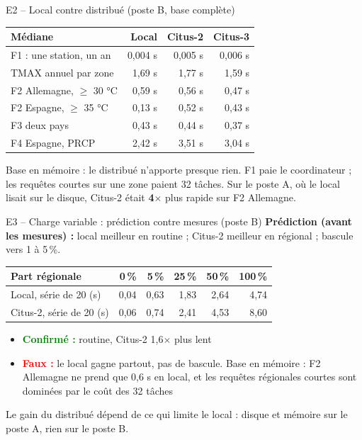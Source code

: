 \documentclass[aspectratio=169]{pres}
\begin{document}
\begin{frame}{E2 -- Local contre distribué (poste B, base complète)}
  \small
  \begin{table}
    \centering
    \begin{tabular}{|l|r|r|r|}
      \hline
      \textbf{Médiane} & \textbf{Local} & \textbf{Citus-2} & \textbf{Citus-3} \\ \hline
      F1 : une station, un an & 0,004 s & 0,005 s & 0,006 s \\
      TMAX annuel par zone & 1,69 s & 1,77 s & 1,59 s \\
      F2 Allemagne, $\geq$ 30 °C & 0,59 s & 0,56 s & 0,47 s \\
      F2 Espagne, $\geq$ 35 °C & 0,13 s & 0,52 s & 0,43 s \\
      F3 deux pays & 0,43 s & 0,44 s & 0,37 s \\
      F4 Espagne, PRCP & 2,42 s & 3,51 s & 3,04 s \\ \hline
    \end{tabular}
  \end{table}
  Base en mémoire : le distribué n'apporte presque rien. F1 paie le coordinateur ; les requêtes courtes sur une zone paient 32 tâches. Sur le poste A, où le local lisait sur le disque, Citus-2 était \textbf{4$\times$} plus rapide sur F2 Allemagne.
\end{frame}

\begin{frame}{E3 -- Charge variable : prédiction contre mesures (poste B)}
  \small
  \textbf{Prédiction (avant les mesures) :} local meilleur en routine ; Citus-2 meilleur en régional ; bascule vers 1 à 5\,\%.
  \begin{table}
    \centering
    \begin{tabular}{|l|r|r|r|r|r|}
      \hline
      \textbf{Part régionale} & 0\,\% & 5\,\% & 25\,\% & 50\,\% & 100\,\% \\ \hline
      Local, série de 20 (s) & 0,04 & 0,63 & 1,83 & 2,64 & 4,74 \\
      Citus-2, série de 20 (s) & 0,06 & 0,74 & 2,41 & 4,53 & 8,60 \\ \hline
    \end{tabular}
  \end{table}
  \begin{itemize}
    \item \textcolor{green}{\textbf{Confirmé :}} routine, Citus-2 1,6$\times$ plus lent
    \item \textcolor{red}{\textbf{Faux :}} le local gagne partout, pas de bascule. Base en mémoire : F2 Allemagne ne prend que 0,6 s en local, et les requêtes régionales courtes sont dominées par le coût des 32 tâches
  \end{itemize}
  Le gain du distribué dépend de ce qui limite le local : disque et mémoire sur le poste A, rien sur le poste B.
\end{frame}
\end{document}

